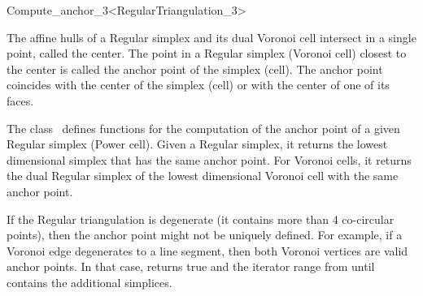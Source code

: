 \ccRefPageBegin

\begin{ccRefClass}{Compute_anchor_3<RegularTriangulation_3>}

\ccDefinition

The affine hulls of a Regular simplex and its dual Voronoi cell
intersect in a single point, called the center. The point in a Regular
simplex (Voronoi cell) closest to the center is called the anchor
point of the simplex (cell). The anchor point coincides with the
center of the simplex (cell) or with the center of one of its faces.

The class \ccRefName\ defines functions for the computation of the
anchor point of a given Regular simplex (Power cell). Given a Regular
simplex, it returns the lowest dimensional simplex that has the same
anchor point. For Voronoi cells, it returns the dual Regular simplex
of the lowest dimensional Voronoi cell with the same anchor point.

If the Regular triangulation is degenerate (it contains more than 4
co-circular points), then the anchor point might not be uniquely
defined. For example, if a Voronoi edge degenerates to a line segment,
then both Voronoi vertices are valid anchor points. In that case,
 returns true and the iterator range from
 until 
contains the additional simplices.


\ccTypes
{}
\ccThreeToTwo

\ccGlue
{}
\ccGlue
{}
\ccGlue
{}


\end{ccRefClass}
